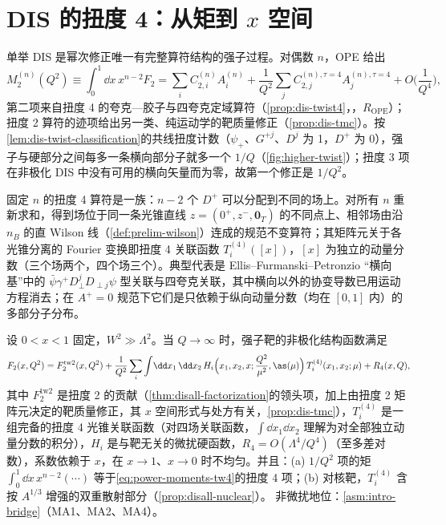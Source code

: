 \section{DIS 的扭度 4：从矩到 \texorpdfstring{$x$}{x} 空间}\label{sec:power-twist4}

单举 DIS 是幂次修正唯一有完整算符结构的强子过程。对偶数 $n$，OPE 给出
\begin{equation}\label{eq:power-moments-tw4}
M_2^{(n)}(Q^2)\equiv\int_0^1\!\dd x\,x^{n-2}F_2
=\sum_iC^{(n)}_{2,i}A^{(n)}_i+\frac1{Q^2}\sum_jC^{(n),\tau=4}_{2,j}A^{(n),\tau=4}_j+O\Big(\frac{1}{Q^4}\Big),
\end{equation}
第二项来自扭度 4 的夸克—胶子与四夸克定域算符（\cref{prop:dis-twist4}，\tagR，$R_{\mathrm{OPE}}$）；扭度 2 算符的迹项给出另一类、纯运动学的靶质量修正（\cref{prop:dis-tmc}）。按\cref{lem:dis-twist-classification}的共线扭度计数（$\psi_+$、$G^{+j}$、$D^j$ 为 1，$D^+$ 为 0），强子与硬部分之间每多一条横向部分子就多一个 $1/Q$（\cref{fig:higher-twist}）；扭度 3 项在非极化 DIS 中没有可用的横向矢量而为零，故第一个修正是 $1/Q^2$。

固定 $n$ 的扭度 4 算符是一族：$n-2$ 个 $D^+$ 可以分配到不同的场上。对所有 $n$ 重新求和，得到场位于同一条光锥直线 $z=(0^+,z^-,\mathbf0_T)$ 的不同点上、相邻场由沿 $n_B$ 的直 Wilson 线（\cref{def:prelim-wilson}）连成的规范不变算符；其矩阵元关于各光锥分离的 Fourier 变换即扭度 4 关联函数 $T^{(4)}_i([x])$，$[x]$ 为独立的动量分数（三个场两个，四个场三个）。典型代表是 Ellis--Furmanski--Petronzio “横向基”中的 $\bar\psi\gamma^+D_\perp^jD_{\perp j}\psi$ 型关联与四夸克关联，其中横向以外的协变导数已用运动方程消去\cite{EllisFurmanskiPetronzio1982,EllisFurmanskiPetronzio1983}；在 $A^+=0$ 规范下它们是只依赖于纵向动量分数（均在 $[0,1]$ 内）的多部分子分布\cite{Jaffe1983}。

\begin{proposition}\label{prop:power-dis-twist4-x}
设 $0<x<1$ 固定，$W^2\gg\Lambda^2$。当 $Q\to\infty$ 时，强子靶的非极化结构函数满足
\begin{equation}\label{eq:power-twist4-x}
F_2(x,Q^2)=F_2^{\mathrm{tw2}}(x,Q^2)+\frac{1}{Q^2}\sum_i\int\!\dd x_1\,\dd x_2\,H_i\Big(x_1,x_2,x;\frac{Q^2}{\mu^2},\as(\mu)\Big)\,T^{(4)}_i(x_1,x_2;\mu)+R_4(x,Q),
\end{equation}
其中 $F_2^{\mathrm{tw2}}$ 是扭度 2 的贡献（\cref{thm:disall-factorization}的领头项，加上由扭度 2 矩阵元决定的靶质量修正，其 $x$ 空间形式与处方有关，\cref{prop:dis-tmc}），$T^{(4)}_i$ 是一组完备的扭度 4 光锥关联函数（对四场关联函数，$\int\dd x_1\dd x_2$ 理解为对全部独立动量分数的积分），$H_i$ 是与靶无关的微扰硬函数，$R_4=O(\Lambda^4/Q^4)$（至多差对数），系数依赖于 $x$，在 $x\to1$、$x\to0$ 时不均匀。并且：(a) $1/Q^2$ 项的矩 $\int_0^1\dd x\,x^{n-2}(\cdots)$ 等于\eqref{eq:power-moments-tw4}的扭度 4 项；(b) 对核靶，$T^{(4)}_i$ 含按 $A^{1/3}$ 增强的双重散射部分（\cref{prop:disall-nuclear}）。
非微扰地位：\cref{asm:intro-bridge}（MA1、MA2、MA4）。
\end{proposition}

